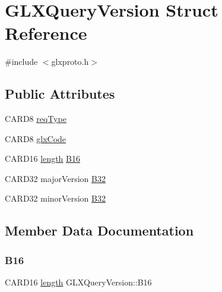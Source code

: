 \hypertarget{struct_g_l_x_query_version}{}\section{G\+L\+X\+Query\+Version Struct Reference}
\label{struct_g_l_x_query_version}


{\ttfamily \#include $<$glxproto.\+h$>$}

\subsection*{Public Attributes}
\begin{DoxyCompactItemize}
\item 
C\+A\+R\+D8 \hyperlink{struct_g_l_x_query_version_ab36d2c29e00257851ddbd7fc06dc69ec}{req\+Type}
\item 
C\+A\+R\+D8 \hyperlink{struct_g_l_x_query_version_a414a8986be1c6692bc4993a2086aa38f}{glx\+Code}
\item 
C\+A\+R\+D16 \hyperlink{glcorearb_8h_ab9c919755bde3b34349e23a32b4e0fa7}{length} \hyperlink{struct_g_l_x_query_version_a08fdff54fee7270fc161af46246a778e}{B16}
\item 
C\+A\+R\+D32 major\+Version \hyperlink{struct_g_l_x_query_version_a8eff4946d696756d9c0add60853e51cd}{B32}
\item 
C\+A\+R\+D32 minor\+Version \hyperlink{struct_g_l_x_query_version_a9a5ce5ef9e365f14641aa30960764811}{B32}
\end{DoxyCompactItemize}


\subsection{Member Data Documentation}
\mbox{\label{struct_g_l_x_query_version_a08fdff54fee7270fc161af46246a778e}} 
\subsubsection{\texorpdfstring{B16}{B16}}
{\footnotesize\ttfamily C\+A\+R\+D16 \hyperlink{glcorearb_8h_ab9c919755bde3b34349e23a32b4e0fa7}{length} G\+L\+X\+Query\+Version\+::\+B16}

\mbox{\label{struct_g_l_x_query_version_a8eff4946d696756d9c0add60853e51cd}} 
